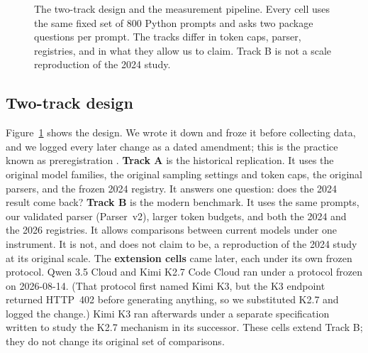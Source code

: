 \documentclass[10pt,twocolumn,letterpaper]{article}
\begin{document}
\begin{figure}[t]
{}
\caption{The two-track design and the measurement pipeline. Every cell uses the same fixed set of 800
Python prompts and asks two package questions per prompt. The tracks differ in token caps, parser,
registries, and in what they allow us to claim. Track B is not a scale reproduction of the 2024
study.}
\label{fig:design}
\end{figure}

\subsection{Two-track design}

Figure~\ref{fig:design} shows the design. We wrote it down and froze it before collecting data, and
we logged every later change as a dated amendment; this is the practice known as preregistration
\citep{nosek2018preregistration}. \textbf{Track A} is the historical replication. It uses the
original model families, the original sampling settings and token caps, the original parsers, and
the frozen 2024 registry. It answers one question: does the 2024 result come back? \textbf{Track B}
is the modern benchmark. It uses the same prompts, our validated parser (Parser~v2), larger token
budgets, and both the 2024 and the 2026 registries. It allows comparisons between current models
under one instrument. It is not, and does not claim to be, a reproduction of the 2024 study at its
original scale. The \textbf{extension cells} came later, each under its own frozen protocol. Qwen 3.5
Cloud and Kimi K2.7 Code Cloud ran under a protocol frozen on 2026-08-14. (That protocol first named
Kimi K3, but the K3 endpoint returned HTTP~402 before generating anything, so we substituted K2.7
and logged the change.) Kimi K3 ran afterwards under a separate specification written to study the
K2.7 mechanism in its successor. These cells extend Track B; they do not change its original set of
comparisons.
\end{document}
